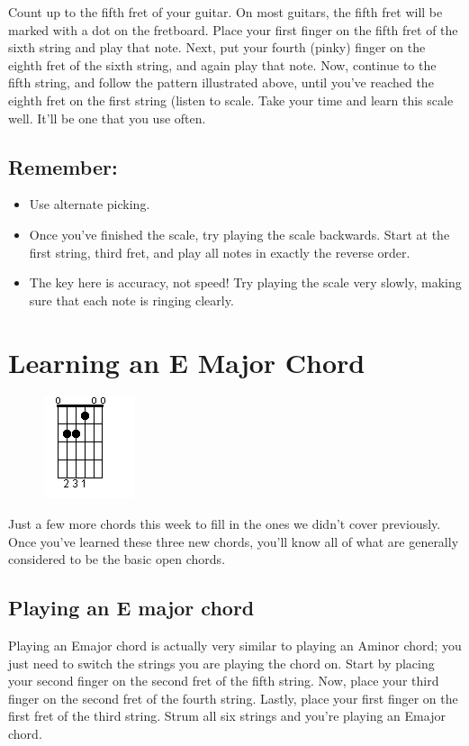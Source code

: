 Count up to the fifth fret of your guitar. On most guitars, the fifth fret will
be marked with a dot on the fretboard. Place your first finger on the fifth
fret of the sixth string and play that note. Next, put your fourth (pinky)
finger on the eighth fret of the sixth string, and again play that note. Now,
continue to the fifth string, and follow the pattern illustrated above, until
you've reached the eighth fret on the first string (listen to scale. Take your
time and learn this scale well. It'll be one that you use often.

\subsection{Remember:}
\begin{itemize}
\item Use alternate picking.
\item Once you've finished the scale, try playing the scale backwards. Start at
      the first string, third fret, and play all notes in exactly the reverse order.
\item The key here is accuracy, not speed! Try playing the scale very slowly,
      making sure that each note is ringing clearly.
\end{itemize}

\section{Learning an E Major Chord}
\begin{figure}
\includegraphics{partthree/openemajor.png}
\end{figure}

Just a few more chords this week to fill in the ones we didn't cover
previously. Once you've learned these three new chords, you'll know all of what
are generally considered to be the basic open chords.

\subsection{Playing an E major chord}

Playing an Emajor chord is actually very similar to playing an Aminor chord;
you just need to switch the strings you are playing the chord on. Start by
placing your second finger on the second fret of the fifth string. Now, place
your third finger on the second fret of the fourth string. Lastly, place your
first finger on the first fret of the third string. Strum all six strings and
you're playing an Emajor chord.

